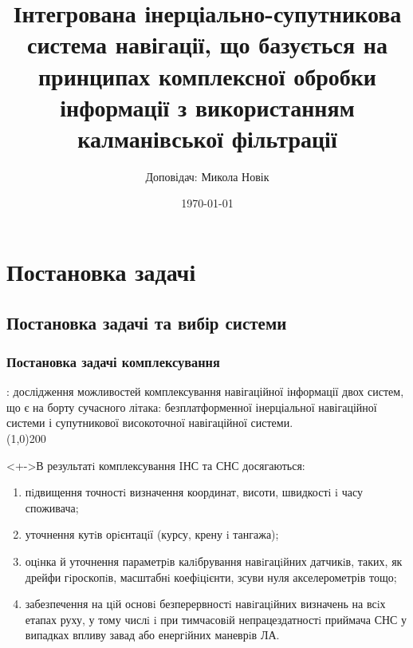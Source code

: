 \documentclass[ucs,compress]{beamer}    %
\begin{document}
\title{Інтегрована інерціально-супутникова система навігації, що базується на принципах комплексної обробки інформації
з використанням калманівської фільтрації}  
\author{Доповідач: Микола Новік}
\date{\today} 
\begin{frame}
\titlepage
\end{frame}
\section{Постановка задачі} 
\subsection{Постановка задачі та вибір системи} 
\begin{frame}\frametitle{Постановка задачі комплексування}
\small
{}: дослідження можливостей комплексування навігаційної інформації двох систем, що є на борту сучасного літака: безплатформенної інерціальної навігаційної системи і супутникової високоточної навігаційної системи.\\
\centering \line(1,0){200}

\begin{block}<+->{В результатi комплексування IНС та СНС досягаються:}
\tiny
\begin{enumerate}
\item  пiдвищення точностi визначення координат, висоти, швидкостi i часу споживача;
\item  уточнення кутiв орiєнтацiї (курсу, крену i тангажа);
\item  оцiнка й уточнення параметрiв калiбрування навiгацiйних датчикiв,
таких, як дрейфи гiроскопiв, масштабнi коефiцiєнти, зсуви нуля акселерометрів тощо;
\item  забезпечення на цiй основi безперервностi навiгацiйних визначень на всiх етапах руху, у тому числi i при тимчасовiй непрацездатностi приймача СНС у випадках впливу завад або енергiйних маневрiв ЛА.

\end{enumerate}
\end{block}

\end{frame} 
\end{document}
